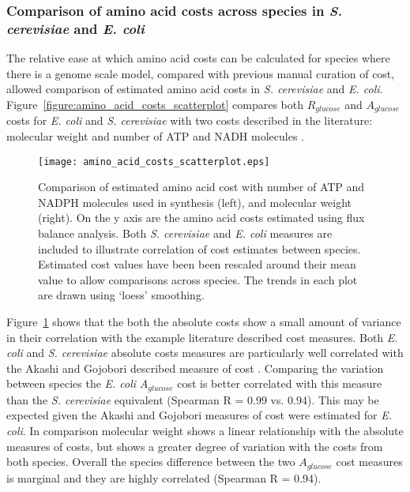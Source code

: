 \subsubsection{Comparison of amino acid costs across species in \emph{S. cerevisiae} and \emph{E. coli}}%

The relative ease at which amino acid costs can be calculated for species where there is a genome scale model, compared with previous manual curation of cost, allowed comparison of estimated amino acid costs in \emph{S. cerevisiae} and \emph{E. coli}. Figure~\vref{figure:amino_acid_costs_scatterplot} compares both $R_{glucose}$ and $A_{glucose}$ costs for \emph{E. coli} and \emph{S. cerevisiae} with two costs described in the literature: molecular weight \cite{seligmann2003} and number of ATP and NADH molecules \cite{akashi2002}.

\begin{figure}%
\centering
\texttt{[image: amino\_acid\_costs\_scatterplot.eps]}
\caption[Comparison of the genome scale model derived cost data sets.]{Comparison of estimated amino acid cost with number of ATP and NADPH molecules used in synthesis (left), and molecular weight (right). On the y axis are the amino acid costs estimated using flux balance analysis. Both \emph{S. cerevisiae} and \emph{E. coli} measures are included to illustrate correlation of cost estimates between species. Estimated cost values have been been rescaled around their mean value to allow comparisons across species. The trends in each plot are drawn using `loess' smoothing.}
\label{figure:amino_acid_costs_scatterplot}
\end{figure}%

Figure~\ref{figure:amino_acid_costs_scatterplot} shows that the both the absolute costs show a small amount of variance in their correlation with the example literature described cost measures. Both \emph{E. coli} and \emph{S. cerevisiae} absolute costs measures are particularly well correlated with the Akashi and Gojobori described measure of cost \cite{akashi2002}. Comparing the variation between species the \emph{E. coli} $A_{glucose}$ cost is better correlated with this measure than the \emph{S. cerevisiae } equivalent (Spearman R = 0.99 vs. 0.94). This may be expected given the Akashi and Gojobori measures of cost were estimated for \emph{E. coli}. In comparison molecular weight shows a linear relationship with the absolute measures of costs, but shows a greater degree of variation with the costs from both species. Overall the species difference between the two $A_{glucose}$ cost measures is marginal and they are highly correlated (Spearman R = 0.94).

